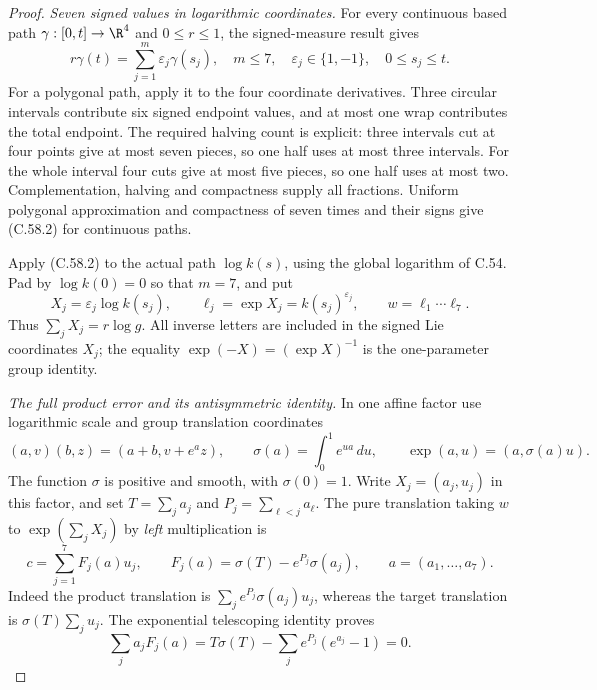 \begin{proof}
\emph{Seven signed values in logarithmic coordinates.}
For every continuous based path $\gamma:[0,t]\to\R^4$
and $0\leq r\leq1$, the signed-measure result
\cite[Theorem~4.7 and \S4.3.2]{C_GrandoniRaviSinghZenklusen2014}
gives
\[
 r\gamma(t)=\sum_{j=1}^{m}\varepsilon_j\gamma(s_j),
 \quad m\leq7,\quad \varepsilon_j\in\{1,-1\},\quad
                         0\leq s_j\leq t.              \tag{C.58.2}
\]
For a polygonal path, apply it to the four coordinate
derivatives. Three circular intervals contribute six
signed endpoint values, and at most one wrap contributes
the total endpoint. The required halving count is explicit:
three intervals cut at four points give at most seven
pieces, so one half uses at most three intervals.
For the whole interval four cuts give at most five pieces,
so one half uses at most two. Complementation, halving
and compactness supply all fractions.
Uniform polygonal approximation and compactness of seven
times and their signs give (C.58.2) for continuous paths.

Apply (C.58.2) to the actual path $\log k(s)$, using the
global logarithm of C.54. Pad by $\log k(0)=0$ so that
$m=7$, and put
\[
 X_j=\varepsilon_j\log k(s_j),\qquad
 \ell_j=\exp X_j=k(s_j)^{\varepsilon_j},\qquad
 w=\ell_1\cdots\ell_7.
                                                               \tag{C.58.3}
\]
Thus $\sum_jX_j=r\log g$. All inverse letters are included
in the signed Lie coordinates $X_j$; the equality
$\exp(-X)=(\exp X)^{-1}$ is the one-parameter group identity.

\emph{The full product error and its antisymmetric identity.}
In one affine factor use logarithmic scale and group
translation coordinates
\[
 (a,v)(b,z)=(a+b,v+e^az),\qquad
 \sigma(a)=\int_0^1e^{ua}\,du,\qquad
                  \exp(a,u)=(a,\sigma(a)u).             \tag{C.58.4}
\]
The function $\sigma$ is positive and smooth, with
$\sigma(0)=1$. Write $X_j=(a_j,u_j)$ in this factor,
and set $T=\sum_j a_j$ and $P_j=\sum_{\ell<j}a_\ell$.
The pure translation taking $w$ to $\exp(\sum_jX_j)$
by \emph{left} multiplication is
\[
 c=\sum_{j=1}^7 F_j(a)u_j,\qquad
 F_j(a)=\sigma(T)-e^{P_j}\sigma(a_j),\qquad
                         a=(a_1,\ldots,a_7).           \tag{C.58.5}
\]
Indeed the product translation is
$\sum_je^{P_j}\sigma(a_j)u_j$, whereas the target
translation is $\sigma(T)\sum_ju_j$.
The exponential telescoping identity proves
\[
 \sum_j a_jF_j(a)
 =T\sigma(T)-\sum_je^{P_j}(e^{a_j}-1)=0.               \tag{C.58.6}
\]


\end{proof}

